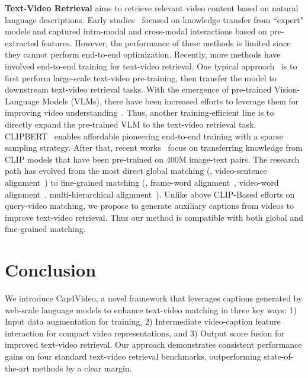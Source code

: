 \documentclass[10pt,twocolumn,letterpaper]{article}
\begin{document}
\noindent\textbf{Text-Video Retrieval}
 aims to retrieve relevant video content based on natural language descriptions. 
Early studies~\cite{gabeur2020mmt, liu2019CE, wang2021DMM, chen2020HGR, wang2021t2vlad} focused on knowledge transfer from ``expert" models and captured intra-modal and cross-modal interactions based on pre-extracted features. However, the performance of these methods is limited since they cannot perform end-to-end optimization.
Recently, more methods have involved end-to-end training for text-video retrieval. One typical approach~\cite{miech2019howto100m, bain2021frozen, miech2020MIL-NCE} is to first perform large-scale text-video pre-training, then transfer the model to downstream text-video retrieval tasks. 
With the emergence of pre-trained Vision-Language Models (VLMs), there have been increased efforts to leverage them for improving video understanding~\cite{bike, text4vis}.
Thus, another training-efficient line is to directly expand the pre-trained VLM to the text-video retrieval task. CLIPBERT~\cite{lei2021clipbert} enables affordable pioneering end-to-end training with a sparse sampling strategy. After that, recent works~\cite{luo2022clip4clip, bogolin2022qbnorm, zhao2022centerclip, gorti2022xpool, liu2022ts2net, gao2021clip2tv, fang2021clip2video, wang2022align, bain2022clip, fang2023uatvr} focus on transferring knowledge from CLIP models that have been pre-trained on 400M image-text pairs. The research path has evolved from the most direct global matching (\ie, video-sentence alignment~\cite{luo2022clip4clip, gao2021clip2tv}) to fine-grained matching (\eg, frame-word alignment~\cite{wang2022disentangled}, video-word alignment~\cite{gorti2022xpool}, multi-hierarchical alignment~\cite{fang2021clip2video, min2022hunyuan_tvr}).
Unlike above CLIP-Based efforts on query-video matching, we propose to generate auxiliary captions from videos to improve text-video retrieval. Thus our method is compatible with both global and fine-grained matching. 
\section{Conclusion}




We introduce Cap4Video, a novel framework that leverages captions generated by web-scale language models to enhance text-video matching in three key ways: 1) Input data augmentation for training, 2) Intermediate video-caption feature interaction for compact video representations, and 3) Output score fusion for improved text-video retrieval.
Our approach demonstrates consistent performance gains on four standard text-video retrieval benchmarks, outperforming state-of-the-art methods by a clear margin. 
\end{document}
